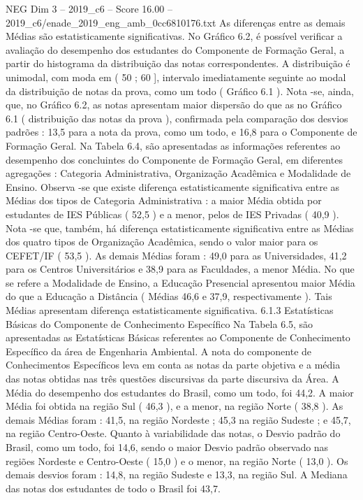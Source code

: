 \begin{textsample}{NEG Dim 3 – 2019\_c6 – Score 16.00 – 2019\_c6/enade\_2019\_eng\_amb\_0cc6810176.txt}
As diferenças entre as demais Médias são estatisticamente significativas.
No Gráfico 6.2, é possível verificar a avaliação do desempenho dos estudantes do Componente de Formação Geral, a partir do histograma da distribuição das notas correspondentes.
A distribuição é unimodal, com moda em ( 50 ; 60 ], intervalo imediatamente seguinte ao modal da distribuição de notas da prova, como um todo ( Gráfico 6.1 ).
Nota -se, ainda, que, no Gráfico 6.2, as notas apresentam maior dispersão do que as no Gráfico 6.1 ( distribuição das notas da prova ), confirmada pela comparação dos desvios padrões : 13,5 para a nota da prova, como um todo, e 16,8 para o Componente de Formação Geral.
Na Tabela 6.4, são apresentadas as informações referentes ao desempenho dos concluintes do Componente de Formação Geral, em diferentes agregações : Categoria Administrativa, Organização Acadêmica e Modalidade de Ensino.
Observa -se que existe diferença estatisticamente significativa entre as Médias dos tipos de Categoria Administrativa : a maior Média obtida por estudantes de IES Públicas ( 52,5 ) e a menor, pelos de IES Privadas ( 40,9 ).
Nota -se que, também, há diferença estatisticamente significativa entre as Médias dos quatro tipos de Organização Acadêmica, sendo o valor maior para os CEFET/IF ( 53,5 ).
As demais Médias foram : 49,0 para as Universidades, 41,2 para os Centros Universitários e 38,9 para as Faculdades, a menor Média.
No que se refere a Modalidade de Ensino, a Educação Presencial apresentou maior Média do que a Educação a Distância ( Médias 46,6 e 37,9, respectivamente ).
Tais Médias apresentam diferença estatisticamente significativa. 6.1.3 Estatísticas Básicas do Componente de Conhecimento Específico Na Tabela 6.5, são apresentadas as Estatísticas Básicas referentes ao Componente de Conhecimento Específico da área de Engenharia Ambiental.
A nota do componente de Conhecimentos Específicos leva em conta as notas da parte objetiva e a média das notas obtidas nas três questões discursivas da parte discursiva da Área.
A Média do desempenho dos estudantes do Brasil, como um todo, foi 44,2.
A maior Média foi obtida na região Sul ( 46,3 ), e a menor, na região Norte ( 38,8 ).
As demais Médias foram : 41,5, na região Nordeste ; 45,3 na região Sudeste ; e 45,7, na região Centro-Oeste.
Quanto à variabilidade das notas, o Desvio padrão do Brasil, como um todo, foi 14,6, sendo o maior Desvio padrão observado nas regiões Nordeste e Centro-Oeste ( 15,0 ) e o menor, na região Norte ( 13,0 ).
Os demais desvios foram : 14,8, na região Sudeste e 13,3, na região Sul.
A Mediana das notas dos estudantes de todo o Brasil foi 43,7.

\end{textsample}
